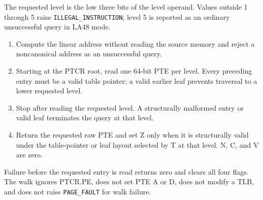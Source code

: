 The requested level is the low three bits of the level operand. Values outside 1 through 5 raise \texttt{ILLEGAL\_INSTRUCTION}; level 5 is reported as an ordinary unsuccessful query in LA48 mode.

\begin{enumerate}
\item Compute the linear address without reading the source memory and reject a noncanonical address as an unsuccessful query.
\item Starting at the PTCR root, read one 64-bit PTE per level. Every preceding entry must be a valid table pointer; a valid earlier leaf prevents traversal to a lower requested level.
\item Stop after reading the requested level. A structurally malformed entry or valid leaf terminates the query at that level.
\item Return the requested raw PTE and set Z only when it is structurally valid under the table-pointer or leaf layout selected by T at that level. N, C, and V are zero.
\end{enumerate}
Failure before the requested entry is read returns zero and clears all four flags. The walk ignores PTCR.PE, does not set PTE A or D, does not modify a TLB, and does not raise \texttt{PAGE\_FAULT} for walk failure.
